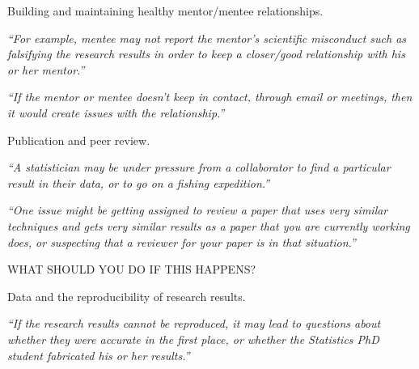\documentclass[portrait,11pt]{seminar}
\begin{document}
\bs
  Building and maintaining healthy mentor/mentee relationships.



\it ``For example, mentee may not report the mentor’s scientific misconduct such as falsifying the research results in order to keep a closer/good relationship with his or her mentor.''


\medskip

\it ``If the mentor or mentee doesn't keep in contact, through email or meetings, then
it would create issues with the relationship.''

\es
\bs
  Publication and peer review. 



\it ``A statistician may be under pressure from a collaborator to find a particular result in their data, or to go on a fishing expedition.''

\es
\bs

{\it ``One issue might be getting assigned to review a paper that uses very similar
techniques and gets very similar results as a paper that you are currently working
does, or suspecting that a reviewer for your paper is in that situation.''}

\medskip

WHAT SHOULD YOU DO IF THIS HAPPENS?

\es

\bs
  Data and the reproducibility of research results.


\it ``If the research results cannot be reproduced, it may lead to questions about
whether they were accurate in the first place, or whether the Statistics PhD
student fabricated his or her results.''
\end{document}
